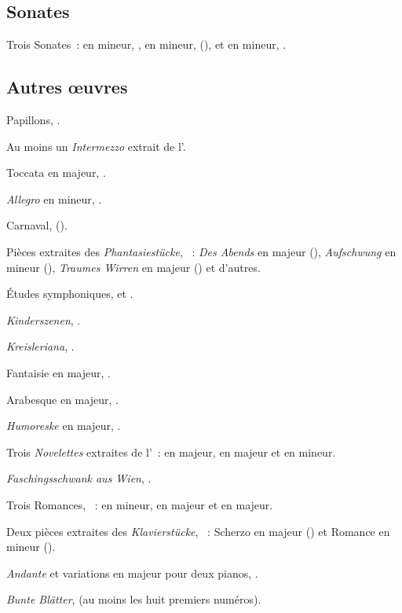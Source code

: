 \subsection{Sonates}

Trois Sonates~: en \kF \Sharp mineur, , en \kF mineur, 
(), et en \kG mineur, .

\subsection{Autres œuvres}

Papillons, .

Au moins un \emph{Intermezzo} extrait de l'.

Toccata en \kC majeur, .

\emph{Allegro} en \kB mineur, .

Carnaval,  ().

Pièces extraites des \emph{Phantasiestücke}, ~: \emph{Des Abends}
en \kD \Flat majeur (), \emph{Aufschwung} en \kF mineur
(), \emph{Traumes Wirren} en \kF majeur () et d'autres.

Études symphoniques,  et .

\emph{Kinderszenen}, .

\emph{Kreisleriana}, .

Fantaisie en \kC majeur, .

Arabesque en \kC majeur, .

\emph{Humoreske} en \kB \Flat majeur, .

Trois \emph{Novelettes} extraites de l'~:  en \kF majeur,
 en \kE majeur et  en \kF \Sharp mineur.

\emph{Faschingsschwank aus Wien}, .

Trois Romances, ~:  en \kB \Flat mineur,  en
\kF \Sharp majeur et  en \kB majeur.

Deux pièces extraites des \emph{Klavierstücke}, ~: Scherzo en \kB
\Flat majeur () et Romance en \kD mineur ().

\emph{Andante} et variations en \kB \Flat majeur pour deux pianos,
.

\emph{Bunte Blätter},  (au moins les huit premiers numéros).

